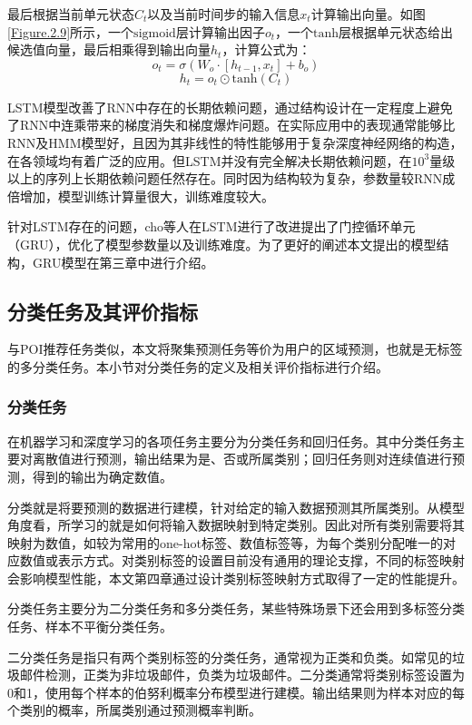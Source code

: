 \documentclass[master]{thesis-uestc}
\begin{document}
最后根据当前单元状态$C_t$以及当前时间步的输入信息$x_t$计算输出向量。如图\ref{Figure.2.9}所示，一个$\mathrm{sigmoid}$层计算输出因子$o_t$，一个$\mathrm{tanh}$层根据单元状态给出候选值向量，最后相乘得到输出向量$h_t$，计算公式为：
\begin{equation}
   o_{t} = \sigma(W_o\cdot[h_{t-1},x_{t}]+b_o)
\end{equation}
\begin{equation}
   h_t = o_t \odot \mathrm{tanh}(C_t)
\end{equation}

LSTM模型改善了RNN中存在的长期依赖问题，通过结构设计在一定程度上避免了RNN中连乘带来的梯度消失和梯度爆炸问题。在实际应用中的表现通常能够比RNN及HMM模型好，且因为其非线性的特性能够用于复杂深度神经网络的构造，在各领域均有着广泛的应用。但LSTM并没有完全解决长期依赖问题，在$10^3$量级以上的序列上长期依赖问题任然存在。同时因为结构较为复杂，参数量较RNN成倍增加，模型训练计算量很大，训练难度较大。

针对LSTM存在的问题，cho等人在LSTM进行了改进提出了门控循环单元（GRU），优化了模型参数量以及训练难度。为了更好的阐述本文提出的模型结构，GRU模型在第三章中进行介绍。

\subsection{分类任务及其评价指标}
与POI推荐任务类似，本文将聚集预测任务等价为用户的区域预测，也就是无标签的多分类任务。本小节对分类任务的定义及相关评价指标进行介绍。

\subsubsection{分类任务}
在机器学习和深度学习的各项任务主要分为分类任务和回归任务。其中分类任务主要对离散值进行预测，输出结果为是、否或所属类别；回归任务则对连续值进行预测，得到的输出为确定数值。

分类就是将要预测的数据进行建模，针对给定的输入数据预测其所属类别。从模型角度看，所学习的就是如何将输入数据映射到特定类别。因此对所有类别需要将其映射为数值，如较为常用的one-hot标签、数值标签等，为每个类别分配唯一的对应数值或表示方式。对类别标签的设置目前没有通用的理论支撑，不同的标签映射会影响模型性能，本文第四章通过设计类别标签映射方式取得了一定的性能提升。

分类任务主要分为二分类任务和多分类任务，某些特殊场景下还会用到多标签分类任务、样本不平衡分类任务。

二分类任务是指只有两个类别标签的分类任务，通常视为正类和负类。如常见的垃圾邮件检测，正类为非垃圾邮件，负类为垃圾邮件。二分类通常将类别标签设置为0和1，使用每个样本的伯努利概率分布模型进行建模。输出结果则为样本对应的每个类别的概率，所属类别通过预测概率判断。
\end{document}
